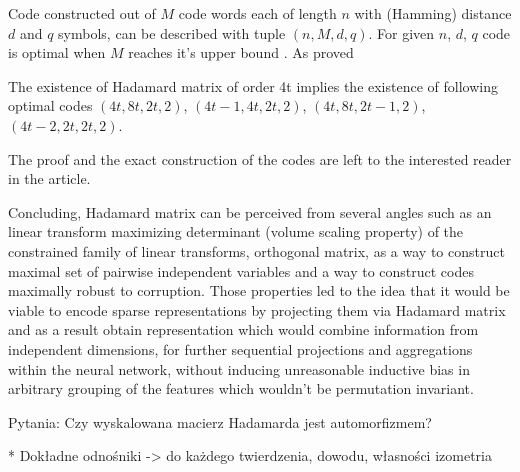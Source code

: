 Code constructed out of $M$ code words each of length $n$ with (Hamming) distance $d$ and $q$ symbols, can be described with tuple $(n, M, d, q)$. For given $n$, $d$, $q$ code is optimal when $M$ reaches it's upper bound \cite{05_plotkin_binary_codes_with_specified_minimum_distance}.
As \cite{05_hedayat_wallis_hadamard_matrices} proved 
\begin{theorem}
    The existence of Hadamard matrix of order 4t implies the existence of following optimal codes $(4t, 8t, 2t, 2)$, $(4t-1, 4t, 2t, 2)$, $(4t, 8t, 2t-1, 2)$, $(4t-2, 2t, 2t, 2)$.
\end{theorem}
The proof and the exact construction of the codes are left to the interested reader in the \cite{05_hedayat_wallis_hadamard_matrices} article.

Concluding, Hadamard matrix can be perceived from several angles such as an linear transform maximizing determinant (volume scaling property) of the constrained family of linear transforms, orthogonal matrix, as a way to construct maximal set of pairwise independent variables and a way to construct codes maximally robust to corruption. 
Those properties led to the idea that it would be viable to encode sparse representations by projecting them via Hadamard matrix and as a result obtain representation which would combine information from independent dimensions, for further sequential  projections and aggregations within the neural network, without inducing unreasonable inductive bias in arbitrary grouping of the features which wouldn't be permutation invariant.





Pytania:
Czy wyskalowana macierz Hadamarda jest automorfizmem?

* Dokładne odnośniki -> do każdego twierdzenia, dowodu, własności
izometria